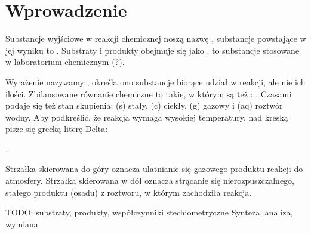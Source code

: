 \section{Wprowadzenie}
\label{section_chemical_reactions_intro}%
Substancje wyjściowe w reakcji chemicznej noszą nazwę , substancje powstające w jej wyniku to .
Substraty i produkty obejmuje się jako .
 to substancje stosowane w laboratorium chemicznym (?).

Wyrażenie  nazywamy , określa ono substancje biorące udział w reakcji, ale nie ich ilości.
Zbilansowane równanie chemiczne to takie, w którym są też : .
Czasami podaje się też stan skupienia: (s) stały, (c) ciekły, (g) gazowy i (aq) roztwór wodny.
Aby podkreślić, że reakcja wymaga wysokiej temperatury, nad kreską pisze się grecką literę Delta:
\begin{center}
    . 
\end{center}

Strzałka skierowana do góry \ce{ ^} oznacza ulatnianie się gazowego produktu reakcji do atmosfery.
Strzałka skierowana w dół  oznacza strącanie się nierozpuszczalnego, stałego produktu (osadu) z roztworu, w którym zachodziła reakcja.

TODO: substraty, produkty, współczynniki stechiometryczne
Synteza, analiza, wymiana
